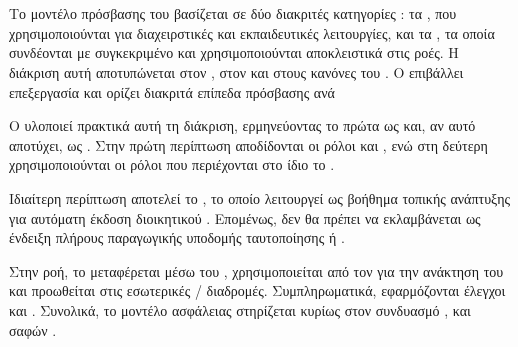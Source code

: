 \section{}
\label{sec:authn_authz_flow}

Το μοντέλο πρόσβασης του  βασίζεται σε δύο διακριτές κατηγορίες : τα , που χρησιμοποιούνται για διαχειρστικές και εκπαιδευτικές λειτουργίες, και τα , τα οποία συνδέονται με συγκεκριμένο  και χρησιμοποιούνται αποκλειστικά στις  ροές. Η διάκριση αυτή αποτυπώνεται στον \texttt{}, στον \texttt{} και στους κανόνες του \texttt{}. Ο \texttt{} επιβάλλει  επεξεργασία και ορίζει διακριτά επίπεδα πρόσβασης ανά 

Ο \texttt{} υλοποιεί πρακτικά αυτή τη διάκριση, ερμηνεύοντας το  πρώτα ως  και, αν αυτό αποτύχει, ως . Στην πρώτη περίπτωση αποδίδονται οι ρόλοι  και , ενώ στη δεύτερη χρησιμοποιούνται οι ρόλοι που περιέχονται στο ίδιο το .

Ιδιαίτερη περίπτωση αποτελεί το  \texttt{}, το οποίο λειτουργεί ως βοήθημα τοπικής ανάπτυξης για αυτόματη έκδοση διοικητικού . Επομένως, δεν θα πρέπει να εκλαμβάνεται ως ένδειξη πλήρους παραγωγικής υποδομής ταυτοποίησης ή .

Στην  ροή, το  μεταφέρεται μέσω του , χρησιμοποιείται από τον  για την ανάκτηση του  και προωθείται στις εσωτερικές / διαδρομές. Συμπληρωματικά, εφαρμόζονται έλεγχοι  και . Συνολικά, το μοντέλο ασφάλειας στηρίζεται κυρίως στον συνδυασμό ,  και σαφών .


\begin{table}[H]
\centering
\caption{Τύποι , πεδίο ισχύος και επιφάνειες χρήσης στην παρούσα υλοποίηση}
\label{tab:token_scope_and_surface}

\end{table}
